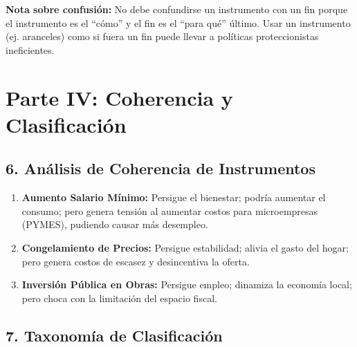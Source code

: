 \documentclass[12pt,spanish]{article}
\providecommand{\tightlist}{%
  \setlength{\itemsep}{0pt}\setlength{\parskip}{0pt}}
\begin{document}
\textbf{Nota sobre confusión:} No debe confundirse un instrumento con un
fin porque el instrumento es el ``cómo'' y el fin es el ``para qué''
último. Usar un instrumento (ej. aranceles) como si fuera un fin puede
llevar a políticas proteccionistas ineficientes.

\section{Parte IV: Coherencia y
Clasificación}\label{parte-iv-coherencia-y-clasificaciuxf3n}

\subsection{6. Análisis de Coherencia de
Instrumentos}\label{anuxe1lisis-de-coherencia-de-instrumentos}

\begin{enumerate}
\def\labelenumi{\arabic{enumi}.}
\tightlist
\item
  \textbf{Aumento Salario Mínimo:} Persigue el bienestar; podría
  aumentar el consumo; pero genera tensión al aumentar costos para
  microempresas (PYMES), pudiendo causar más desempleo.
\item
  \textbf{Congelamiento de Precios:} Persigue estabilidad; alivia el
  gasto del hogar; pero genera costos de escasez y desincentiva la
  oferta.
\item
  \textbf{Inversión Pública en Obras:} Persigue empleo; dinamiza la
  economía local; pero choca con la limitación del espacio fiscal.
\end{enumerate}

\subsection{7. Taxonomía de
Clasificación}\label{taxonomuxeda-de-clasificaciuxf3n}
\end{document}
